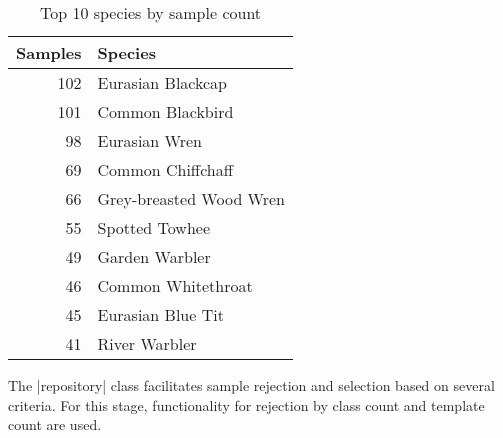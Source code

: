 \begin{table}[!htb]%
  \caption{Top 10 species by sample count}\label{tab:top10}
  \centering
    \begin{tabular}{r l}
      Samples & Species \\ \hline
      102 & Eurasian Blackcap\\
      101 & Common Blackbird\\
      98  & Eurasian Wren\\
      69  & Common Chiffchaff\\
      66  & Grey-breasted Wood Wren\\
      55  & Spotted Towhee\\
      49  & Garden Warbler\\
      46  & Common Whitethroat\\
      45  & Eurasian Blue Tit\\
      41  & River Warbler\\
    \end{tabular}
\end{table}

The |repository| class facilitates sample rejection and selection based on
several criteria.
For this stage, functionality for rejection by class count and template count
are used.

